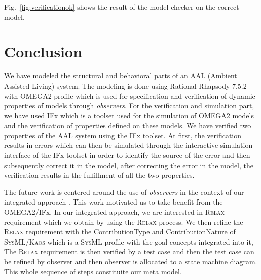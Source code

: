 \documentclass[a4paper,twoside]{article}
\def\myrelax{\textsc{Relax}}                  %
\def\sysml{\textsc{SysML}}
\def\kaos{\textsc{Kaos}}
\begin{document}
Fig.~\ref{fig:verificationok} shows the result of the model-checker on the correct model.

\section{{Conclusion}
\label{sec:conclusion}}
We have modeled the structural and behavioral parts of an AAL (Ambient Assisted Living) system. The modeling is done using Rational Rhapsody 7.5.2  with OMEGA2 profile which is used for specification and verification of dynamic properties of models through \textit{observers}. For the verification and simulation part, we have used IFx which is a toolset used for the simulation of OMEGA2 models and the verification of properties defined on these models. We have verified two properties of the AAL system using the IFx toolset. At first, the verification results in errors which can then be simulated through the interactive simulation interface of the IFx toolset in order to identify the source of the error and then subsequently correct it in the model, after correcting the error in the model, the verification results in the fulfillment of all the two properties. 

The future work is centered around the use of \textit{observers} in the context of our integrated approach \cite{test17}. This work motivated us to take benefit from the OMEGA2/IFx. In our integrated approach, we are interested in \myrelax{} requirement which we obtain by using the \myrelax{} process. We then refine the \myrelax{} requirement with the ContributionType and ContributionNature of \sysml{}/\kaos{} which is a \sysml{} profile with the goal concepts integrated into it,
The \myrelax{} requirement is then verified by a test case and then the test case can be refined by observer and then observer is allocated to a state machine diagram. This whole sequence of steps constituite our meta model.

\end{document}
